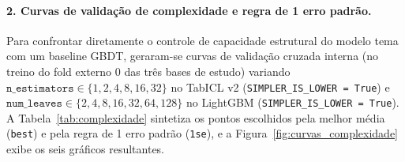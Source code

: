 \documentclass[11pt,a4paper]{article}
\begin{document}
\paragraph{2. Curvas de validação de complexidade e regra de 1 erro padrão.}
Para confrontar diretamente o controle de capacidade estrutural do modelo tema com um baseline GBDT, geraram-se curvas de validação cruzada interna (no treino do fold externo 0 das três bases de estudo) variando $\texttt{n\_estimators} \in \{1, 2, 4, 8, 16, 32\}$ no TabICL v2 (\texttt{SIMPLER\_IS\_LOWER = True}) e $\texttt{num\_leaves} \in \{2, 4, 8, 16, 32, 64, 128\}$ no LightGBM (\texttt{SIMPLER\_IS\_LOWER = True}). A Tabela~\ref{tab:complexidade} sintetiza os pontos escolhidos pela melhor média (\texttt{best}) e pela regra de 1 erro padrão (\texttt{1se}), e a Figura~\ref{fig:curvas_complexidade} exibe os seis gráficos resultantes.

\begin{table}[htbp]
    \centering
    \caption{Seleção de complexidade pela melhor média (\texttt{best}) e pela regra de 1 erro padrão (\texttt{1se}) nas curvas de validação interna (AUC OvO, treino do fold externo 0).}
    \label{tab:complexidade}
    \small
\end{table}
\end{document}
